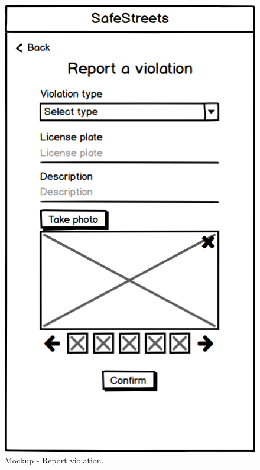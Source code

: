 \begin{@empty}
\begin{figure}[H]
\centering
\begin{minipage}{.4\textwidth}
    \centering
    \includegraphics[width=.8\textwidth]{Images/report-violation.png}
    \caption{\label{fig:mockup-report-violation}Mockup - Report violation.}
\end{minipage}
\begin{minipage}{.4\textwidth}
    \centering

\end{minipage}
\end{figure}
\end{@empty}
